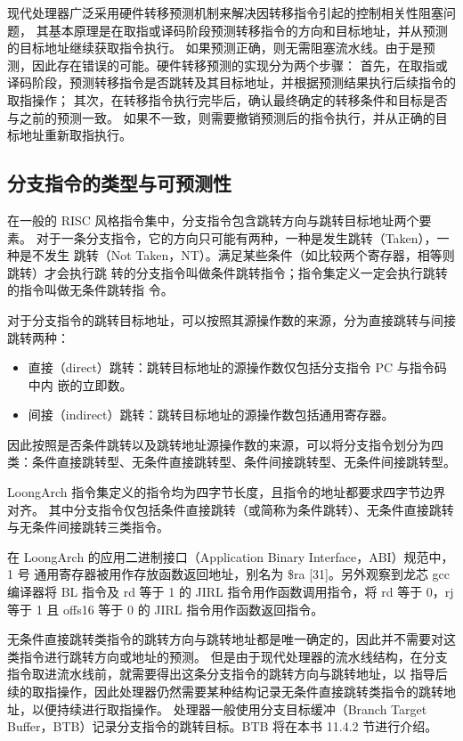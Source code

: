 现代处理器广泛采用硬件转移预测机制来解决因转移指令引起的控制相关性阻塞问题，
其基本原理是在取指或译码阶段预测转移指令的方向和目标地址，并从预测的目标地址继续获取指令执行。
如果预测正确，则无需阻塞流水线。由于是预测，因此存在错误的可能。硬件转移预测的实现分为两个步骤：
首先，在取指或译码阶段，预测转移指令是否跳转及其目标地址，并根据预测结果执行后续指令的取指操作；
其次，在转移指令执行完毕后，确认最终确定的转移条件和目标是否与之前的预测一致。
如果不一致，则需要撤销预测后的指令执行，并从正确的目标地址重新取指执行。

\subsection{分支指令的类型与可预测性}\label{sec:11-advanced-cpu-018}

在一般的 RISC 风格指令集中，分支指令包含跳转方向与跳转目标地址两个要素。
对于一条分支指令，它的方向只可能有两种，一种是发生跳转（Taken），一种是不发生
跳转（Not Taken，NT）。满足某些条件（如比较两个寄存器，相等则跳转）才会执行跳
转的分支指令叫做条件跳转指令；指令集定义一定会执行跳转的指令叫做无条件跳转指
令。

对于分支指令的跳转目标地址，可以按照其源操作数的来源，分为直接跳转与间接
跳转两种：

\begin{itemize}
\item
  直接（direct）跳转：跳转目标地址的源操作数仅包括分支指令 PC 与指令码中内
  嵌的立即数。
\item
  间接（indirect）跳转：跳转目标地址的源操作数包括通用寄存器。
\end{itemize}

因此按照是否条件跳转以及跳转地址源操作数的来源，可以将分支指令划分为四
类：条件直接跳转型、无条件直接跳转型、条件间接跳转型、无条件间接跳转型。

LoongArch 指令集定义的指令均为四字节长度，且指令的地址都要求四字节边界对齐。
其中分支指令仅包括条件直接跳转（或简称为条件跳转）、无条件直接跳转与无条件间接跳转三类指令。

在 LoongArch 的应用二进制接口（Application Binary Interface，ABI）规范中，1 号
通用寄存器被用作存放函数返回地址，别名为 \$ra {[}31{]}。另外观察到龙芯 gcc 编译器将 BL
指令及 rd 等于 1 的 JIRL 指令用作函数调用指令，将 rd 等于 0，rj 等于 1 且 offs16 等于
0 的 JIRL 指令用作函数返回指令。

无条件直接跳转类指令的跳转方向与跳转地址都是唯一确定的，因此并不需要对这类指令进行跳转方向或地址的预测。
但是由于现代处理器的流水线结构，在分支指令取进流水线前，就需要得出这条分支指令的跳转方向与跳转地址，以
指导后续的取指操作，因此处理器仍然需要某种结构记录无条件直接跳转类指令的跳转地址，以便持续进行取指操作。
处理器一般使用分支目标缓冲（Branch Target Buffer，BTB）记录分支指令的跳转目标。BTB 将在本书 11.4.2 节进行介绍。

